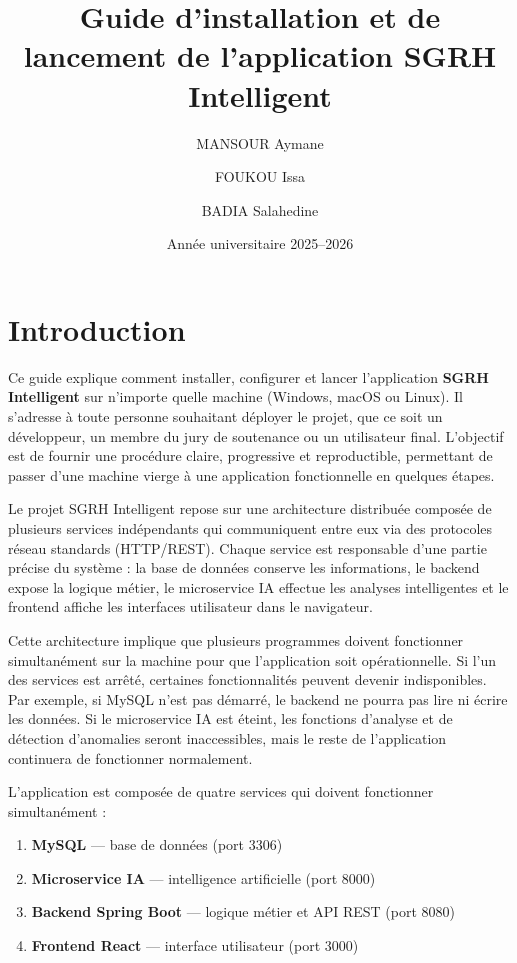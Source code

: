 \documentclass[12pt,a4paper]{report}
\title{Guide d'installation et de lancement de l'application SGRH Intelligent}
\author{MANSOUR Aymane \and FOUKOU Issa \and BADIA Salahedine}
\date{Année universitaire 2025--2026}
\begin{document}
\sloppy

\maketitle
\tableofcontents
\newpage

\chapter{Introduction}

Ce guide explique comment installer, configurer et lancer l'application \textbf{SGRH Intelligent} sur n'importe quelle machine (Windows, macOS ou Linux). Il s'adresse à toute personne souhaitant déployer le projet, que ce soit un développeur, un membre du jury de soutenance ou un utilisateur final. L'objectif est de fournir une procédure claire, progressive et reproductible, permettant de passer d'une machine vierge à une application fonctionnelle en quelques étapes.

Le projet SGRH Intelligent repose sur une architecture distribuée composée de plusieurs services indépendants qui communiquent entre eux via des protocoles réseau standards (HTTP/REST). Chaque service est responsable d'une partie précise du système : la base de données conserve les informations, le backend expose la logique métier, le microservice IA effectue les analyses intelligentes et le frontend affiche les interfaces utilisateur dans le navigateur.

Cette architecture implique que plusieurs programmes doivent fonctionner simultanément sur la machine pour que l'application soit opérationnelle. Si l'un des services est arrêté, certaines fonctionnalités peuvent devenir indisponibles. Par exemple, si MySQL n'est pas démarré, le backend ne pourra pas lire ni écrire les données. Si le microservice IA est éteint, les fonctions d'analyse et de détection d'anomalies seront inaccessibles, mais le reste de l'application continuera de fonctionner normalement.

L'application est composée de quatre services qui doivent fonctionner simultanément :
\begin{enumerate}
    \item \textbf{MySQL} — base de données (port 3306)
    \item \textbf{Microservice IA} — intelligence artificielle (port 8000)
    \item \textbf{Backend Spring Boot} — logique métier et API REST (port 8080)
    \item \textbf{Frontend React} — interface utilisateur (port 3000)
\end{enumerate}
\end{document}
